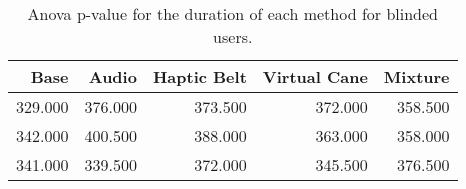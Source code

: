 
\begin{table}[!htb]
\centering
\caption{Anova p-value for the duration of each method for blinded users.}
\label{tab:anova_duration}
\begin{tabular}{rrrrr}
\toprule
   Base &   Audio &  Haptic Belt &  Virtual Cane &  Mixture \\
\midrule
329.000 & 376.000 &      373.500 &       372.000 &  358.500 \\
342.000 & 400.500 &      388.000 &       363.000 &  358.000 \\
341.000 & 339.500 &      372.000 &       345.500 &  376.500 \\
\bottomrule
\end{tabular}
\end{table}


